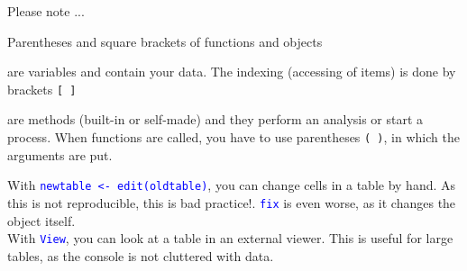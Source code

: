 \documentclass[xcolor=table,           xcolor=dvipsnames]{beamer}\usepackage[]{graphicx}\usepackage[]{color}
\newcommand{\rcode}[1]{\texttt{\textcolor{Blue}{#1}}} %
\begin{document}

\begin{frame}[fragile]{Please note ...}
\begin{block}{Parentheses and square brackets of functions and objects}
\pause
\begin{description}[<+->]
\item[objects] are variables and contain your data. The indexing (accessing of items) is done by brackets \texttt{[ ]}
\item[functions] are methods (built-in or self-made) and they perform an analysis or start a process. When functions are called, you have to use parentheses \texttt{( )}, in which the arguments are put.
\end{description}
\end{block}
 With \rcode{newtable <- edit(oldtable)}, you can change cells in a table by hand. \alert{As this is not reproducible, this is bad practice!}. \rcode{fix} is even worse, as it changes the object itself.\\
With \rcode{View}, you can look at a table in an external viewer. This is useful for large tables, as the console is not cluttered with data.
\end{frame}

\end{document}
